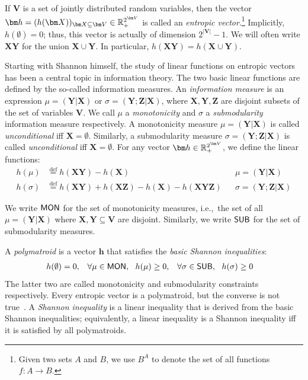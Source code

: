 \documentclass{theoretics}
\newcommand{\defeq}{\stackrel{\text{def}}{=}}
\newcommand{\Rp}{{\mathbb R}_{\tiny +}} %
\newcommand{\mon}{\text{\sf MON}}
\newcommand{\sub}{\text{\sf SUB}}
\begin{document}
If $\bm V$ is a set of jointly distributed random variables, then the vector
$\bm h = (h(\bm X))_{\bm X \subseteq \bm V}\in\Rp^{2^{\bm V}}$ is called an
{\em entropic vector}.\footnote{Given two sets $A$ and $B$, we use
$B^A$ to denote the set of all functions $f:A\rightarrow B$.}
Implicitly, $h(\emptyset) = 0$; thus, this vector is actually of dimension $2^{|\bm V|}-1$.
We will often write $\bm X\bm Y$ for the union $\bm X \cup \bm Y$.
In particular, $h(\bm X \bm Y) = h(\bm X \cup\bm Y)$.

Starting with Shannon himself, the study of linear functions on entropic vectors has been a
central topic in information theory. The two basic linear functions are defined by the
so-called information measures. An {\em information measure} is an expression $\mu = (\bm
Y|\bm X)$ or $\sigma = (\bm Y; \bm Z|\bm X)$, where $\bm X, \bm Y, \bm Z$ are disjoint
subsets of the set of variables $\bm V$.  We call $\mu$ a {\em monotonicity} and $\sigma$ a
{\em submodularity} information measure respectively. A monotonicity measure $\mu = (\bm
Y|\bm X)$ is called {\em unconditional} iff $\bm X = \emptyset$. Similarly, a submodularity
measure $\sigma = (\bm Y;\bm Z|\bm X)$ is called {\em unconditional} iff $\bm X =
\emptyset$.
For any vector $\bm h \in
\Rp^{2^{\bm V}}$, we define the linear functions:
\begin{align*}
  h(\mu) & \defeq h(\bm X\bm Y) - h(\bm X) && \mu=(\bm Y|\bm X)\\
  h(\sigma) & \defeq h(\bm X\bm Y)+h(\bm X\bm Z)-h(\bm X)-h(\bm X\bm Y\bm Z)
    && \sigma=(\bm Y;\bm Z|\bm X)
\end{align*}
%

We write $\mon$ for the set of monotonicity measures, i.e.,~the set of all $\mu = (\bm Y|\bm X)$
where $\bm X,\bm Y\subseteq \bm V$ are disjoint.
Similarly, we write $\sub$ for the
set of submodularity measures.

A \emph{polymatroid} is a vector $\bm h$
that satisfies the {\em basic Shannon inequalities}:
%
\begin{align}
  h(\emptyset) &= 0,
  & \forall \mu \in \mon,\ \ h(\mu) &\geq 0,
  &\forall \sigma \in \sub,\ \ h(\sigma) & \geq 0
  \label{eq:shannon}
\end{align}
%
The latter two are called monotonicity and submodularity constraints respectively.
Every entropic vector is a polymatroid, but the converse is not
true~\cite{DBLP:journals/tit/ZhangY97}.
A {\em Shannon inequality} is a linear inequality that is derived from the
basic Shannon inequalities; equivalently, a linear inequality is a
Shannon inequality iff it is satisfied by all polymatroids.
\end{document}

